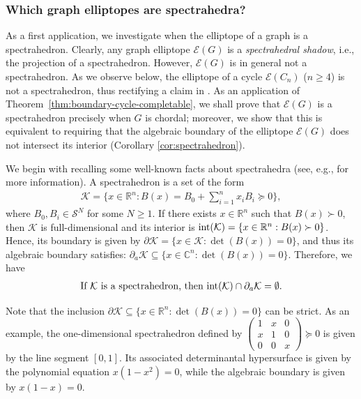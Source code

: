 \documentclass[a4paper, 11pt, twoside]{article}
\newcommand{\C}{\mathbb{C}}
\newcommand{\R}{\mathbb{R}}
\newcommand{\ME}{{\mathcal E}}
\newcommand{\MS}{{\mathcal S}}
\newcommand{\MK}{{\mathcal K}}
\theoremstyle{plain}
\begin{document}
\subsubsection*{Which graph elliptopes are spectrahedra?}
As a first application, we investigate when the elliptope of a graph is a spectrahedron.
Clearly, any graph elliptope $\ME(G)$ is a {\em spectrahedral shadow}, i.e., the projection of a spectrahedron. 
However, $\ME(G)$ is in general not a spectrahedron. As we observe below, the elliptope of a cycle $\ME(C_n)$ ($n\ge 4$) is not a spectrahedron, thus rectifying a claim in \cite[Section 4.2]{Sturmfels2010MultivariateGaussians}. As an application of Theorem~\ref{thm:boundary-cycle-completable}, we shall prove that $\ME(G)$ is a spectrahedron precisely when   $G$ is chordal; moreover, we show that this is equivalent to requiring that the algebraic boundary of the elliptope $\ME(G)$ does not intersect its interior
(Corollary \ref{cor:spectrahedron}).

We begin with recalling some well-known facts about spectrahedra (see, e.g., \cite{BPT-2012} for more information). A spectrahedron is a set of the form
\begin{align}\label{eq:Kd}
\MK=\Big\{x\in \R^n: B(x)= B_0+\sum_{i=1}^n x_i B_i\succeq 0\Big\},
\end{align}
where $B_0,B_i\in \MS^N$ for some $N\ge 1$. 
If there exists $x\in \R^n$ such that $B(x)\succ 0$, then $\MK$ is full-dimensional and its interior is
$\text{\rm int}(\MK) =\{x\in\R^n: B(x)\succ 0\}$. 
Hence, its boundary is given by $\partial \MK=\{x\in\MK: \det(B(x))=0\}$, and thus its algebraic boundary satisfies:
$\partial_a \MK \subseteq\{x\in\C^n : \det(B(x))=0\}$.  Therefore, we have
\begin{align}\label{eq:boundary-spec}
\text{If } \MK \text{ is a spectrahedron, then } \text{\rm int}(\MK)  \cap \partial_a \MK=\emptyset.
\end{align}

Note that the inclusion $\partial \MK \subseteq \{x\in\R^n : \det(B(x))=0\}$
 can be strict. 
As an example, the one-dimensional spectrahedron defined by $\left (\begin{smallmatrix}
1 & x & 0 \\ x & 1 & 0 \\ 0 & 0 & x 
\end{smallmatrix}\right )\succeq 0$ is given by the line segment $[0,1]$. 
Its associated determinantal hypersurface is given by the polynomial equation $x(1-x^2)=0$, while the algebraic boundary is given by $x(1-x)=0$. 
\end{document}
